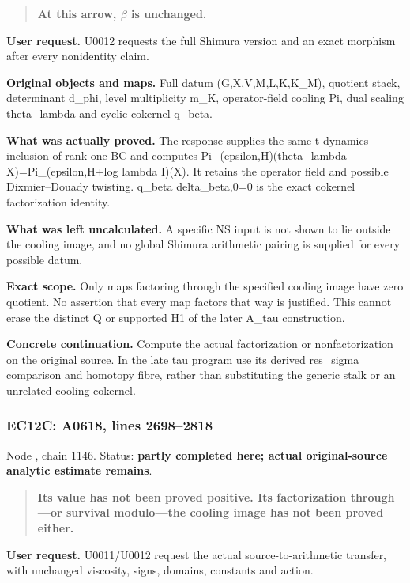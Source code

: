 \documentclass[10pt,a4paper,oneside]{report}
\begin{document}
\begin{quote}
\textbf{At this arrow, \(\beta\) is unchanged.}
\end{quote}

\textbf{User request.} U0012 requests the full Shimura version and an
exact morphism after every nonidentity claim.

\textbf{Original objects and maps.} Full datum (G,X,V,M,L,K,K\_M),
quotient stack, determinant d\_phi, level multiplicity m\_K,
operator-field cooling Pi, dual scaling theta\_lambda and cyclic
cokernel q\_beta.

\textbf{What was actually proved.} The response supplies the same-t
dynamics inclusion of rank-one BC and computes
Pi\_(epsilon,H)(theta\_lambda X)=Pi\_(epsilon,H+log lambda I)(X). It
retains the operator field and possible Dixmier--Douady twisting.
q\_beta delta\_beta,0=0 is the exact cokernel factorization identity.

\textbf{What was left uncalculated.} A specific NS input is not shown to
lie outside the cooling image, and no global Shimura arithmetic pairing
is supplied for every possible datum.

\textbf{Exact scope.} Only maps factoring through the specified cooling
image have zero quotient. No assertion that every map factors that way
is justified. This cannot erase the distinct Q or supported H1 of the
later A\_tau construction.

\textbf{Concrete continuation.} Compute the actual factorization or
nonfactorization on the original source. In the late tau program use its
derived res\_sigma comparison and homotopy fibre, rather than
substituting the generic stalk or an unrelated cooling cokernel.

\subsubsection{EC12C: A0618, lines
2698--2818}\label{ec12c-a0618-lines-26982818}

Node \protect{}, chain 1146.
Status: \textbf{partly completed here; actual original-source analytic
estimate remains}.

\begin{quote}
\textbf{Its value has not been proved positive. Its factorization
through---or survival modulo---the cooling image has not been proved
either.}
\end{quote}

\textbf{User request.} U0011/U0012 request the actual
source-to-arithmetic transfer, with unchanged viscosity, signs, domains,
constants and action.
\end{document}
